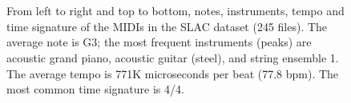 \documentclass{article}
\begin{document}
\begin{figure}[ht]
    \centering
    \parbox{\linewidth}{
    ~
   }
    \parbox{\linewidth}{
        ~
    }
\caption{From left to right and top to bottom, notes, instruments, tempo and time signature of the MIDIs in the SLAC dataset (245 files). The average note is G3; the most frequent instruments (peaks) are acoustic grand piano, acoustic guitar (steel), and string ensemble 1. The average tempo is 771K microseconds per beat (77.8 bpm). The most common time signature is 4/4.}
    \label{fig:stats-slac}
\end{figure}
\end{document}

